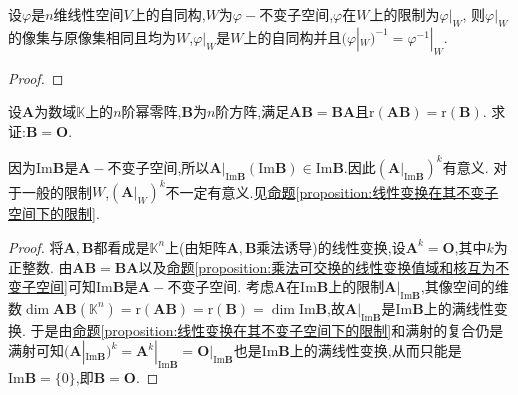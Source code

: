 \documentclass[../../main.tex]{subfiles}%
\begin{document}
\begin{proposition}\label{proposition:自同构在其不变子空间下的限制}
设\(\varphi\)是\(n\)维线性空间\(V\)上的自同构,\(W\)为\(\varphi -\)不变子空间,\(\varphi\)在\(W\)上的限制为\(\varphi|_W\),
则\(\varphi|_W\)的像集与原像集相同且均为\(W\),\(\varphi|_W\)是\(W\)上的自同构并且\((\varphi|_W)^{-1} = \varphi^{-1}|_W\).
\end{proposition}
\begin{proof}



\end{proof}


\begin{example}
设\(\boldsymbol{A}\)为数域\(\mathbb{K}\)上的\(n\)阶幂零阵,\(\boldsymbol{B}\)为\(n\)阶方阵,满足\(\boldsymbol{A}\boldsymbol{B}=\boldsymbol{B}\boldsymbol{A}\)且\(\text{r}(\boldsymbol{A}\boldsymbol{B})=\text{r}(\boldsymbol{B})\). 求证:\(\boldsymbol{B}=\boldsymbol{O}\).
\end{example}
\begin{remark}
因为$\text{Im}\boldsymbol{B}$是$\boldsymbol{A}-$不变子空间,所以\(\boldsymbol{A}|_{\text{Im}\boldsymbol{B}}(\text{Im}\boldsymbol{B})\in \text{Im}\boldsymbol{B}\).因此$(\boldsymbol{A}|_{\text{Im}\boldsymbol{B}})^k $有意义.
对于一般的限制$W$,$(\boldsymbol{A}|_{W})^k $不一定有意义.见\hyperref[proposition:线性变换在其不变子空间下的限制]{命题\ref{proposition:线性变换在其不变子空间下的限制}}.
\end{remark}
\begin{proof}

将\(\boldsymbol{A},\boldsymbol{B}\)都看成是\(\mathbb{K}^n\)上(由矩阵\(\boldsymbol{A},\boldsymbol{B}\)乘法诱导)的线性变换,设\(\boldsymbol{A}^k = \boldsymbol{O}\),其中\(k\)为正整数. 由\(\boldsymbol{A}\boldsymbol{B}=\boldsymbol{B}\boldsymbol{A}\)以及\hyperref[proposition:乘法可交换的线性变换值域和核互为不变子空间]{命题\ref{proposition:乘法可交换的线性变换值域和核互为不变子空间}}可知\(\text{Im}\boldsymbol{B}\)是\(\boldsymbol{A}-\)不变子空间. 考虑\(\boldsymbol{A}\)在\(\text{Im}\boldsymbol{B}\)上的限制\(\boldsymbol{A}|_{\text{Im}\boldsymbol{B}}\),其像空间的维数\(\dim\boldsymbol{A}\boldsymbol{B}(\mathbb{K}^n)=\text{r}(\boldsymbol{A}\boldsymbol{B})=\text{r}(\boldsymbol{B})=\dim\text{Im}\boldsymbol{B}\),故\(\boldsymbol{A}|_{\text{Im}\boldsymbol{B}}\)是\(\text{Im}\boldsymbol{B}\)上的满线性变换. 于是由\hyperref[proposition:线性变换在其不变子空间下的限制]{命题\ref{proposition:线性变换在其不变子空间下的限制}}和满射的复合仍是满射可知\((\boldsymbol{A}|_{\text{Im}\boldsymbol{B}})^k = \boldsymbol{A}^k|_{\text{Im}\boldsymbol{B}}=\boldsymbol{O}|_{\text{Im}\boldsymbol{B}}\)也是\(\text{Im}\boldsymbol{B}\)上的满线性变换,从而只能是\(\text{Im}\boldsymbol{B}=\{0\}\),即\(\boldsymbol{B}=\boldsymbol{O}\). 

\end{proof}
\end{document}
